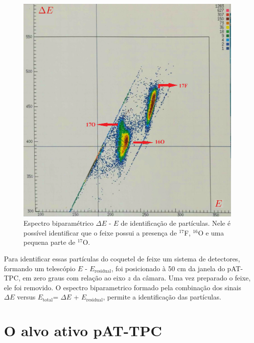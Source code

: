\documentclass[a4paper,12pt,oneside]{book}
\begin{document}
\begin{figure}[H]
    \centering
    \includegraphics[scale = 0.12]{figs/pid_17F.png}
    \caption{Espectro biparamétrico $\Delta E$ - $E$ de identificação de partículas. Nele é possível identificar que o feixe possui a presença de $^{17}$F, $^{16}$O e uma pequena parte de $^{17}$O.}
    \label{fig:PID_17F}
\end{figure}

\par Para identificar essas partículas do coquetel de feixe um sistema de detectores, formando um telescópio $E$ - $E_{\mathrm{residual}}$, foi posicionado à 50 cm da janela do pAT-TPC, em zero graus com relação ao eixo $z$ da câmara. Uma vez preparado o feixe, ele foi removido. O espectro biparametrico formado pela combinação dos sinais $\Delta E$ versus $E_{\mathrm{total}}$= $\Delta E$ + $E_{\mathrm{residual}}$, permite a identificação das partículas. 

\section{O alvo ativo pAT-TPC}

\end{document}
